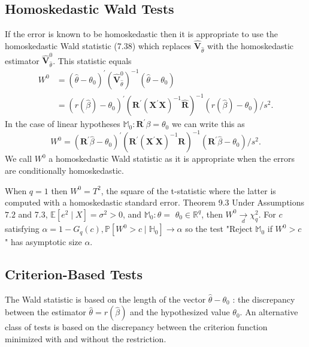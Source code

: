 \documentclass[10pt]{article}
\begin{document}
\subsection{Homoskedastic Wald Tests}
If the error is known to be homoskedastic then it is appropriate to use the homoskedastic Wald statistic (7.38) which replaces $\widehat{\boldsymbol{V}}_{\widehat{\theta}}$ with the homoskedastic estimator $\widehat{\boldsymbol{V}}_{\widehat{\theta}}^{0}$. This statistic equals
$$
\begin{aligned}
W^{0} &=\left(\widehat{\theta}-\theta_{0}\right)^{\prime}\left(\widehat{\boldsymbol{V}}_{\widehat{\theta}}^{0}\right)^{-1}\left(\widehat{\theta}-\theta_{0}\right) \\
&=\left(r(\widehat{\beta})-\theta_{0}\right)^{\prime}\left(\boldsymbol{R}^{\prime}\left(\boldsymbol{X}^{\prime} \boldsymbol{X}\right)^{-1} \widehat{\boldsymbol{R}}\right)^{-1}\left(r(\widehat{\beta})-\theta_{0}\right) / s^{2} .
\end{aligned}
$$
In the case of linear hypotheses $\mathbb{M}_{0}: \boldsymbol{R}^{\prime} \beta=\theta_{0}$ we can write this as
$$
W^{0}=\left(\boldsymbol{R}^{\prime} \widehat{\beta}-\theta_{0}\right)^{\prime}\left(\boldsymbol{R}^{\prime}\left(\boldsymbol{X}^{\prime} \boldsymbol{X}\right)^{-1} \boldsymbol{R}\right)^{-1}\left(\boldsymbol{R}^{\prime} \widehat{\beta}-\theta_{0}\right) / s^{2} .
$$
We call $W^{0}$ a homoskedastic Wald statistic as it is appropriate when the errors are conditionally homoskedastic.

When $q=1$ then $W^{0}=T^{2}$, the square of the t-statistic where the latter is computed with a homoskedastic standard error. Theorem 9.3 Under Assumptions $7.2$ and 7.3, $\mathbb{E}\left[e^{2} \mid X\right]=\sigma^{2}>0$, and $\mathbb{M}_{0}: \theta=$ $\theta_{0} \in \mathbb{R}^{q}$, then $W^{0} \underset{d}{\longrightarrow} \chi_{q}^{2}$. For $c$ satisfying $\alpha=1-G_{q}(c), \mathbb{P}\left[W^{0}>c \mid \mathbb{H}_{0}\right] \longrightarrow \alpha$ so the test "Reject $\mathbb{M}_{0}$ if $W^{0}>c$ " has asymptotic size $\alpha$.

\subsection{Criterion-Based Tests}
The Wald statistic is based on the length of the vector $\widehat{\theta}-\theta_{0}$ : the discrepancy between the estimator $\widehat{\theta}=r(\widehat{\beta})$ and the hypothesized value $\theta_{0}$. An alternative class of tests is based on the discrepancy between the criterion function minimized with and without the restriction.
\end{document}
